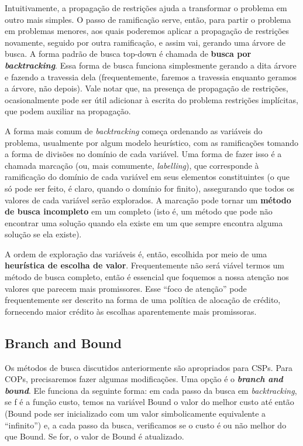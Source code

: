 \documentclass{article}
\theoremstyle{remark}
\theoremstyle{theorem}
\begin{document}
Intuitivamente, a propagação de restrições ajuda a transformar o problema em outro mais simples. O passo de ramificação serve, então, para partir o problema em problemas menores, aos quais poderemos aplicar a propagação de restrições novamente, seguido por outra ramificação, e assim vai, gerando uma árvore de busca. A forma padrão de busca top-down é chamada de \textbf{busca por \textit{backtracking}}. Essa forma de busca funciona simplesmente
gerando a dita árvore e fazendo a travessia dela (frequentemente, faremos a travessia enquanto geramos a árvore, não depois). Vale notar que, na presença de propagação de restrições, ocasionalmente pode ser útil adicionar à escrita do problema restrições implícitas, que podem auxiliar na propagação.

A forma mais comum de \textit{backtracking} começa ordenando as variáveis do problema, usualmente por algum modelo heurístico, com as ramificações tomando a forma de divisões no domínio de cada variável. Uma forma de fazer isso é a chamada marcação (ou, mais comumente, \textit{labelling}), que corresponde à ramificação do domínio de cada variável em seus elementos constituintes (o que só pode ser feito, é claro, quando o domínio for finito), assegurando que todos os valores de cada variável
serão explorados. A marcação pode tornar um \textbf{método de busca incompleto}
em um completo (isto é, um método que pode não encontrar uma solução quando ela existe em um que sempre encontra alguma solução se ela existe).

A ordem de exploração das variáveis é, então, escolhida por meio de uma \textbf{heurística de escolha de valor}. Frequentemente não será viável termos um método de busca completo, então é essencial que foquemos a nossa atenção nos valores que parecem mais promissores. Esse ``foco de atenção'' pode frequentemente ser descrito na forma de uma política de alocação de crédito, fornecendo maior crédito às escolhas aparentemente mais promissoras.

\subsection{Branch and Bound}

Os métodos de busca discutidos anteriormente são apropriados para CSPs. Para COPs, precisaremos fazer algumas modificações. Uma opção é o \textit{\textbf{branch and bound}}. Ele funciona da seguinte forma: em cada passo da busca em \textit{backtracking}, se f é a função custo, temos na variável Bound o valor do melhor custo até então (Bound pode ser inicializado com um valor simbolicamente equivalente a ``infinito'') e, a cada passo da busca, verificamos se o custo é ou não melhor do que Bound. Se for, o valor de Bound é atualizado.
\end{document}
